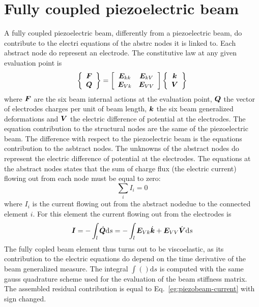 \section{Fully coupled piezoelectric beam}
A fully coupled piezoelectric beam, differently from a piezoelectric beam,
do contribute to the electri equations of the abstrc nodes it is
linked to.
Each abstract node do represent an electrode. The constitutive law
at any given evaluation point is
\begin{equation}
	\cubr{
		\cvvect{
			\T{F}\\
			\T{Q}
		}
	}=\sqbr{
		\matr{cc}{
			\T{E}_{kk} & \T{E}_{kV}\\
			\T{E}_{Vk} & \T{E}_{VV}
		}
	}
	\cubr{
		\cvvect{
			\T{k}\\
			\T{V}
		}
	}
\end{equation}
where $\T{F}$ are the six beam internal actions at the evaluation point, 
$\T{Q}$ the vector of electrodes charges per unit of beam length,
$\T{k}$ the six beam generalized deformations and $\T{V}$ the electric difference of potential
at the electrodes.
The equation contribution to the structural nodes are the same of the piezoelectric beam.
The difference with respect to the piezoelectric beam is the equations contribution to the
asbtract nodes. The unknowns of the abstract nodes do represent the electric difference of potential
at the electrodes. The equations at the abstract nodes states that the sum of charge flux (the electric
current) flowing out from each node must be equal to zero:
\begin{equation}
	\sum_i I_i = 0
\end{equation}
where $I_i$ is the current flowing out from the abstract nodedue to the connected element $i$.
For this element the current flowing out from the electrodes is
\begin{equation}
	\T{I} = -\int_l \dot{\T{Q}} \mathrm{d}s = 
		-\int_l \T{E}_{Vk}\dot{\T{k}}  + \T{E}_{VV} \dot{\T{V}} \mathrm{d}s
		\label{eg:piezobeam-current}
\end{equation}
The fully copled beam element thus turns out to be viscoelastic, as its contribution to the electric
equations do depend on the time derivative of the beam generalized measure.
The integral $\int () \mathrm{d}s$ is computed with the same gauss quadrature scheme
used for the evaluation of the beam stiffness matrix.
The assembled residual contribution is equal to Eq.~\eqref{eg:piezobeam-current} with sign changed.
